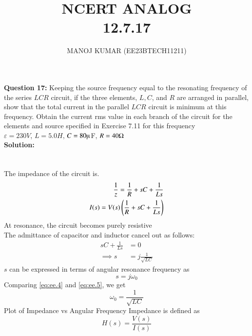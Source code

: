 \documentclass[journal,12pt,twocolumn]{IEEEtran}
\theoremstyle{remark}
\begin{document}

\vspace{3cm}

\title{NCERT ANALOG \\12.7.17}
\author{MANOJ KUMAR (EE23BTECH11211)}
\maketitle
\newpage

\bigskip

\renewcommand{\thefigure}{\theenumi}
\renewcommand{\thetable}{\theenumi}
\textbf{Question 17:}
Keeping the source frequency equal to the resonating frequency of the series $LCR$ circuit, if the three elements, $L, C$, and $R$ are arranged in parallel, show that the total current in the parallel $LCR$ circuit is minimum at this frequency. Obtain the current rms value in each branch of the circuit for the elements and source specified in Exercise 7.11 for this frequency\\
   $\varepsilon =230V$, $L=5.0H$, $C=80\micro$F, $R=40\ohm$\\
    
\textbf{Solution:}\\
\\
\\
    
The impedance of the circuit is.
 \begin{align}
     \frac{1}{z}=\frac{1}{R}+sC+\frac{1}{Ls}\\
     I(s)=V(s)\left(\frac{1}{R}+sC+\frac{1}{Ls}\right)
     \label{eq:ee.2}
 \end{align}
At resonance, the circuit becomes purely resistive\\
The admittance of capacitor and inductor cancel out as follows:
  \begin{align}
    sC + \frac{1}{Ls} &= 0\\
    \implies s &= j\frac{1}{\sqrt{LC}} \label{eq:ee.4}
\end{align}
$s$ can be expressed in terms of angular resonance frequency as
\begin{equation}
    s = j\omega_0 \label{eq:ee.5}
\end{equation}
Comparing \eqref{eq:ee.4} and \eqref{eq:ee.5}, we get
\begin{equation}
    \omega_0 = \frac{1}{\sqrt{LC}}
\end{equation}
Plot of Impedance vs Angular Frequency
Impedance is defined as
\begin{equation}
    H(s) = \frac{V(s)}{I(s)}
\end{equation}
\end{document}
